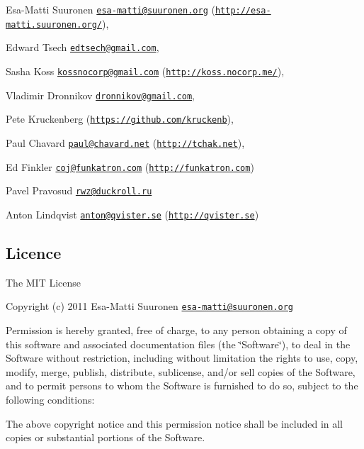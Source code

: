 \begin{DoxyItemize}
\item Esa-\/\+Matti Suuronen \href{mailto:esa-matti@suuronen.org}{\tt esa-\/matti@suuronen.\+org} (\href{http://esa-matti.suuronen.org/}{\tt http\+://esa-\/matti.\+suuronen.\+org/}),
\item Edward Tsech \href{mailto:edtsech@gmail.com}{\tt edtsech@gmail.\+com},
\item Sasha Koss \href{mailto:kossnocorp@gmail.com}{\tt kossnocorp@gmail.\+com} (\href{http://koss.nocorp.me/}{\tt http\+://koss.\+nocorp.\+me/}),
\item Vladimir Dronnikov \href{mailto:dronnikov@gmail.com}{\tt dronnikov@gmail.\+com},
\item Pete Kruckenberg (\href{https://github.com/kruckenb}{\tt https\+://github.\+com/kruckenb}),
\item Paul Chavard \href{mailto:paul@chavard.net}{\tt paul@chavard.\+net} (\href{http://tchak.net}{\tt http\+://tchak.\+net}),
\item Ed Finkler \href{mailto:coj@funkatron.com}{\tt coj@funkatron.\+com} (\href{http://funkatron.com}{\tt http\+://funkatron.\+com})
\item Pavel Pravosud \href{mailto:rwz@duckroll.ru}{\tt rwz@duckroll.\+ru}
\item Anton Lindqvist \href{mailto:anton@qvister.se}{\tt anton@qvister.\+se} (\href{http://qvister.se}{\tt http\+://qvister.\+se})
\end{DoxyItemize}

\subsection*{Licence}

The M\+I\+T License

Copyright (c) 2011 Esa-\/\+Matti Suuronen \href{mailto:esa-matti@suuronen.org}{\tt esa-\/matti@suuronen.\+org}

Permission is hereby granted, free of charge, to any person obtaining a copy of this software and associated documentation files (the \char`\"{}\+Software\char`\"{}), to deal in the Software without restriction, including without limitation the rights to use, copy, modify, merge, publish, distribute, sublicense, and/or sell copies of the Software, and to permit persons to whom the Software is furnished to do so, subject to the following conditions\+:

The above copyright notice and this permission notice shall be included in all copies or substantial portions of the Software.

